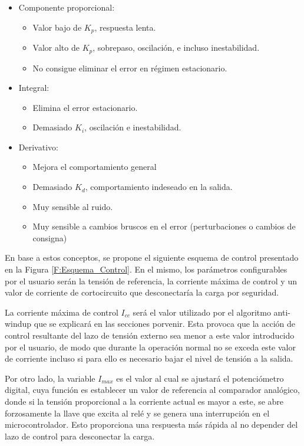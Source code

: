 \begin{itemize}
\item Componente proporcional:
\begin{itemize}
\item Valor bajo de $K_p$, respuesta lenta.
\item Valor alto de $K_p$, sobrepaso, oscilación, e incluso inestabilidad.
\item No consigue eliminar el error en régimen estacionario.
\end{itemize}
\item Integral:
\begin{itemize}
\item Elimina el error estacionario.
\item Demasiado $K_i$, oscilación e inestabilidad.
\end{itemize}
\item Derivativo:
\begin{itemize}
\item Mejora el comportamiento general
\item Demasiado $K_d$, comportamiento indeseado en la salida.
\item Muy sensible al ruido.
\item Muy sensible a cambios bruscos en el error (perturbaciones o cambios de consigna)
\end{itemize}
\end{itemize}\par 

En base a estos conceptos, se propone el siguiente esquema de control presentado en la Figura \ref{F:Esquema_Control}. En el mismo, los parámetros configurables por el usuario serán la tensión de referencia, la corriente máxima de control y un valor de corriente de cortocircuito que desconectaría la carga por seguridad. \par 
La corriente máxima de control $I_{cc}$ será el valor utilizado por el algoritmo anti-windup que se explicará en las secciones porvenir. Esta provoca que la acción de control resultante del lazo de tensión externo sea menor a este valor introducido por el usuario, de modo que durante la operación normal no se exceda este valor de corriente incluso si para ello es necesario bajar el nivel de tensión a la salida. \par 
Por otro lado, la variable $I_{max}$ es el valor al cual se ajustará el potenciómetro digital, cuya función es establecer un valor de referencia al comparador analógico, donde si la tensión proporcional a la corriente actual es mayor a este, se abre forzosamente la llave que excita al relé y se genera una interrupción en el microcontrolador. Esto proporciona una respuesta más rápida al no depender del lazo de control para desconectar la carga. \par 

